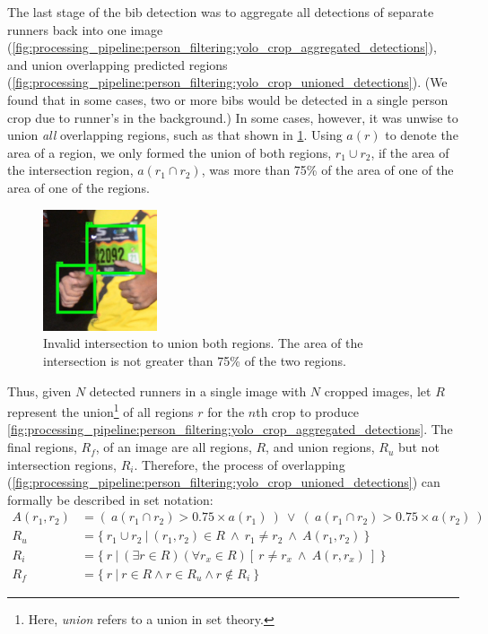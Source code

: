 The last stage of the bib detection was to aggregate all detections of separate runners back into one image (\cref{fig:processing_pipeline:person_filtering:yolo_crop_aggregated_detections}), and union overlapping predicted regions (\cref{fig:processing_pipeline:person_filtering:yolo_crop_unioned_detections}). (We found that in some cases, two or more bibs would be detected in a single person crop due to runner's in the background.) In some cases, however, it was unwise to union \textit{all} overlapping regions, such as that shown in \cref{fig:processing_pipeline:hand}. Using $a(r)$ to denote the area of a region, we only formed the union of both regions, $r_{1} \cup r_{2}$, if the area of the intersection region, $a(r_{1} \cap r_{2})$, was more than 75\% of the area of one of the area of one of the regions.

\begin{figure}[h]
  \centering
  \includegraphics[width=0.3\textwidth]{images/processing/hand}
  \caption[Invalid intersection to union both regions]{Invalid intersection to union both regions. The area of the intersection is not greater than 75\% of the two regions.}
  \label{fig:processing_pipeline:hand}
\end{figure}

Thus, given $N$ detected runners in a single image with $N$ cropped images, let $R$ represent the union\footnote{Here, \textit{union} refers to a union in set theory.} of all regions $r$ for the $n$th crop to produce \cref{fig:processing_pipeline:person_filtering:yolo_crop_aggregated_detections}. The final regions, $R_{f}$, of an image are all regions, $R$, and union regions, $R_{u}$ but not intersection regions, $R_{i}$. Therefore, the process of overlapping (\cref{fig:processing_pipeline:person_filtering:yolo_crop_unioned_detections}) can formally be described in set notation:
\begin{align*}
A(r_{1}, r_{2}) &= (\ a(r_{1} \cap r_{2}) > 0.75 \times a(r_{1})\ ) \ \vee \ (\ a(r_{1} \cap r_{2}) > 0.75 \times a(r_{2})\ )\\
R_{u} &= \{\ r_{1} \cup r_{2}\ |\ (r_{1}, r_{2}) \in R \ \wedge\ r_{1} \neq r_{2} \ \wedge\  A(r_{1}, r_{2})\ \}\\
R_{i} &= \{\ r \ |\ (\exists r \in R)(\forall r_{x} \in R)[\ r \neq r_{x}\ \wedge\  A(r, r_{x})\ ]\ \}\\
R_{f} &= \{\ r\ |\ r \in R \wedge r \in R_{u} \wedge r \not\in R_{i}\ \}
\end{align*}

